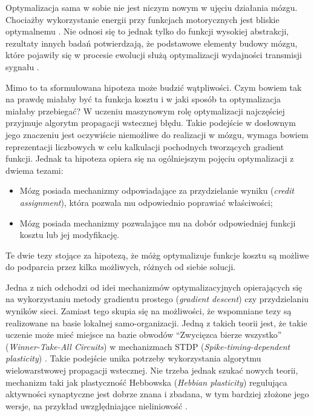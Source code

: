 Optymalizacja sama w sobie nie jest niczym nowym w ujęciu działania mózgu.
Chociażby wykorzystanie energii przy funkcjach motorycznych jest bliskie optymalnemu \cite{taylor2011does}.
Nie odnosi się to jednak tylko do funkcji wysokiej abstrakcji, rezultaty innych badań potwierdzają, że podstawowe elementy budowy mózgu, które pojawiły się w procesie ewolucji służą optymalizacji wydajności transmisji sygnału \cite{paprocki2020optimizing}.

Mimo to ta sformułowana hipoteza może budzić wątpliwości.
Czym bowiem tak na prawdę miałaby być ta funkcja kosztu i w jaki sposób ta optymalizacja miałaby przebiegać?
W uczeniu maszynowym rolę optymalizacji najczęściej przyjmuje algorytm propagacji wstecznej błędu.
Takie podejście w dosłownym jego znaczeniu jest oczywiście niemożliwe do realizacji w mózgu, wymaga bowiem reprezentacji liczbowych w celu kalkulacji pochodnych tworzących gradient funkcji.
Jednak ta hipoteza opiera się na ogólniejszym pojęciu optymalizacji z dwiema tezami:

\begin{itemize}
	\item Mózg posiada mechanizmy odpowiadające za przydzielanie wyniku (\emph{credit assignment}), która pozwala mu odpowiednio poprawiać właściwości;
	\item Mózg posiada mechanizmy pozwalające mu na dobór odpowiedniej funkcji kosztu lub jej modyfikację.
\end{itemize}

Te dwie tezy stojące za hipotezą, że móżg optymalizuje funkcje kosztu są możliwe do podparcia przez kilka możliwych, różnych od siebie solucji.

Jedna z nich odchodzi od idei mechanizmów optymalizacyjnych opierających się na wykorzystaniu metody gradientu prostego (\emph{gradient descent}) czy przydzielaniu wyników sieci.
Zamiast tego skupia się na możliwości, że wspomniane tezy są realizowane na basie lokalnej samo-organizacji.
Jedną z takich teorii jest, że takie uczenie może mieć miejsce na bazie obwodów ``Zwycięzca bierze wszystko'' (\emph{Winner-Take-All Circuits}) w mechanizmach STDP (\emph{Spike-timing-dependent plasticity}) \cite{kappel2014stdp}.
Takie podejście unika potrzeby wykorzystania algorytmu wielowarstwowej propagacji wstecznej.
Nie trzeba jednak szukać nowych teorii, mechanizm taki jak plastyczność Hebbowska (\emph{Hebbian plasticity}) regulująca aktywności synaptyczne jest dobrze znana i zbadana, w tym bardziej złożone jego wersje, na przykład uwzględniające nieliniowość \cite{brito2016nonlinear}.

